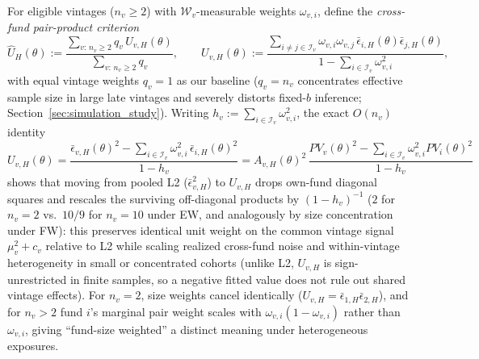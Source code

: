 \documentclass[12pt]{article}
\begin{document}
For eligible vintages ($n_v \ge 2$) with $\mathcal{W}_v$-measurable weights $\omega_{v,i}$, define the \emph{cross-fund pair-product criterion}
\begin{equation}
\label{eq:u_criterion}
\widehat{U}_H(\theta) := \frac{\sum_{v:\, n_v \ge 2} q_v\, U_{v,H}(\theta)}{\sum_{v:\, n_v \ge 2} q_v},
\qquad
U_{v,H}(\theta) := \frac{\sum_{i \neq j \in \mathcal{I}_v} \omega_{v,i}\omega_{v,j}\,\bar\epsilon_{i,H}(\theta)\bar\epsilon_{j,H}(\theta)}{1 - \sum_{i \in \mathcal{I}_v}\omega_{v,i}^2},
\end{equation}
with equal vintage weights $q_v = 1$ as our baseline ($q_v = n_v$ concentrates effective sample size in large late vintages and severely distorts fixed-$b$ inference; Section~\ref{sec:simulation_study}).
Writing $h_v := \sum_{i \in \mathcal{I}_v}\omega_{v,i}^2$, the exact $O(n_v)$ identity
\begin{equation}
\label{eq:u_identity}
U_{v,H}(\theta) = \frac{\bar\epsilon_{v,H}(\theta)^2 - \sum_{i \in \mathcal{I}_v}\omega_{v,i}^2\,\bar\epsilon_{i,H}(\theta)^2}{1 - h_v}
= A_{v,H}(\theta)^2\,\frac{PV_v(\theta)^2 - \sum_{i \in \mathcal{I}_v}\omega_{v,i}^2 PV_i(\theta)^2}{1 - h_v}
\end{equation}
shows that moving from pooled L2 ($\bar\epsilon_{v,H}^2$) to $U_{v,H}$ drops own-fund diagonal squares and rescales the surviving off-diagonal products by $(1 - h_v)^{-1}$ ($2$ for $n_v = 2$ vs.\ $10/9$ for $n_v = 10$ under EW, and analogously by size concentration under FW): this preserves identical unit weight on the common vintage signal $\mu_v^2 + c_v$ relative to L2 while scaling realized cross-fund noise and within-vintage heterogeneity in small or concentrated cohorts (unlike L2, $U_{v,H}$ is sign-unrestricted in finite samples, so a negative fitted value does not rule out shared vintage effects).
For $n_v = 2$, size weights cancel identically ($U_{v,H} = \bar\epsilon_{1,H}\bar\epsilon_{2,H}$), and for $n_v > 2$ fund $i$'s marginal pair weight scales with $\omega_{v,i}(1 - \omega_{v,i})$ rather than $\omega_{v,i}$, giving ``fund-size weighted'' a distinct meaning under heterogeneous exposures.
\end{document}
